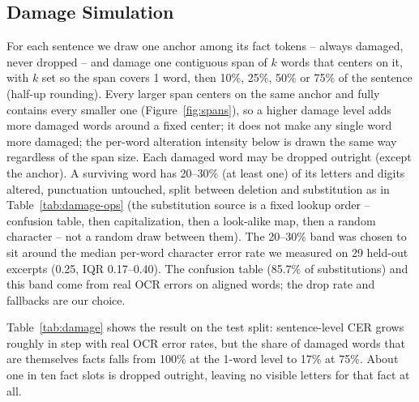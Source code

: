 \subsection{Damage Simulation}
\label{sec:damage}
For each sentence we draw one anchor among its fact tokens -- always damaged, never dropped -- and damage one
contiguous span of $k$ words that centers on it, with $k$ set so the span covers 1 word, then 10\%, 25\%, 50\% or
75\% of the sentence (half-up rounding). Every larger span centers on the same anchor and fully contains every
smaller one (Figure~\ref{fig:spans}), so a higher damage level adds more damaged words around a fixed center; it
does not make any single word more damaged; the per-word alteration intensity below is drawn the same way
regardless of the span size. Each damaged word may be dropped outright (except the anchor). A surviving word has 20--30\% (at least one) of its
letters and digits altered, punctuation untouched, split between deletion and substitution as in
Table~\ref{tab:damage-ops} (the substitution source is a fixed lookup order -- confusion table, then
capitalization, then a look-alike map, then a random character -- not a random draw between them). 
The 20--30\% band was chosen to sit around the median per-word character error rate we measured on 29 held-out \bln{} excerpts
(0.25, IQR 0.17--0.40). 
The confusion table (85.7\% of substitutions) and this band come from real OCR errors on aligned words; the drop rate and fallbacks are our choice.

Table~\ref{tab:damage} shows the result on the test split: sentence-level CER grows roughly in step with real \bln{} OCR error rates, but
the share of damaged words that are themselves facts falls from 100\% at the 1-word level to 17\% at 75\%. About one in ten fact slots is dropped outright, leaving no visible letters for that fact at all.

